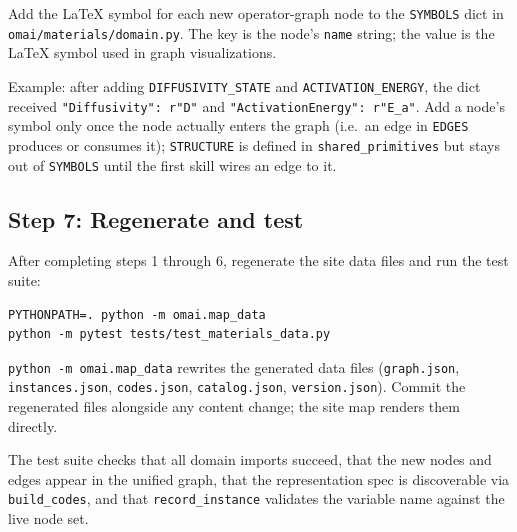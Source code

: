 \documentclass[11pt,a4paper]{article}
\begin{document}
Add the LaTeX symbol for each new operator-graph node to the \texttt{SYMBOLS} dict
in \texttt{omai/materials/domain.py}. The key is the node's \texttt{name} string;
the value is the LaTeX symbol used in graph visualizations.

Example: after adding \texttt{DIFFUSIVITY\_STATE} and \texttt{ACTIVATION\_ENERGY},
the dict received \texttt{"Diffusivity": r"D"} and \texttt{"ActivationEnergy":
r"E\_a"}. Add a node's symbol only once the node actually enters the graph (i.e.\
an edge in \texttt{EDGES} produces or consumes it); \texttt{STRUCTURE} is defined in
\texttt{shared\_primitives} but stays out of \texttt{SYMBOLS} until the first skill
wires an edge to it.

\subsection{Step 7: Regenerate and test}

After completing steps 1 through 6, regenerate the site data files and run the test
suite:

\begin{verbatim}
PYTHONPATH=. python -m omai.map_data
python -m pytest tests/test_materials_data.py
\end{verbatim}

\texttt{python -m omai.map\_data} rewrites the generated data files
(\texttt{graph.json}, \texttt{instances.json}, \texttt{codes.json},
\texttt{catalog.json}, \texttt{version.json}). Commit the regenerated files
alongside any content change; the site map renders them directly.

The test suite checks that all domain imports succeed, that the new nodes and edges
appear in the unified graph, that the representation spec is discoverable via
\texttt{build\_codes}, and that \texttt{record\_instance} validates the variable
name against the live node set.
\end{document}
